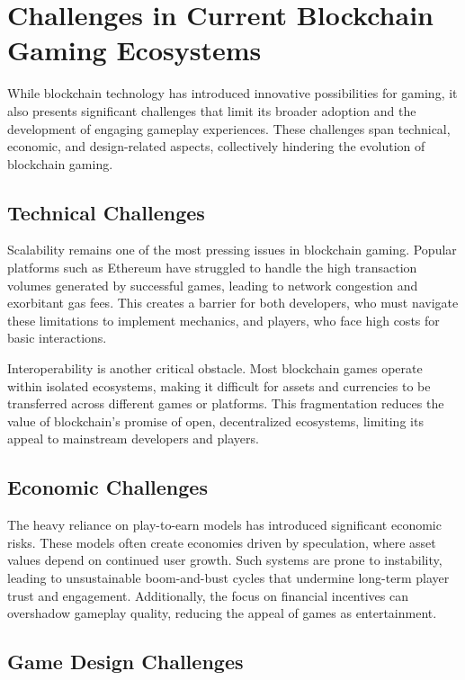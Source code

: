 \section{Challenges in Current Blockchain Gaming Ecosystems}

While blockchain technology has introduced innovative possibilities for gaming,
it also presents significant challenges that limit its broader adoption and the
development of engaging gameplay experiences. These challenges span technical,
economic, and design-related aspects, collectively hindering the evolution of
blockchain gaming.

\subsection{Technical Challenges}

Scalability remains one of the most pressing issues in blockchain gaming.
Popular platforms such as Ethereum have struggled to handle the high transaction
volumes generated by successful games, leading to network congestion and
exorbitant gas fees\cite{min_blockchain_2019}. This creates a barrier for both developers, who must
navigate these limitations to implement mechanics, and players, who face high
costs for basic interactions.

Interoperability is another critical obstacle. Most blockchain games operate
within isolated ecosystems, making it difficult for assets and currencies to be
transferred across different games or platforms. This fragmentation reduces the
value of blockchain’s promise of open, decentralized ecosystems, limiting its
appeal to mainstream developers and players\cite{jiang_cryptokitties_2021}.

\subsection{Economic Challenges}

The heavy reliance on play-to-earn models has introduced significant economic
risks. These models often create economies driven by speculation, where asset
values depend on continued user growth. Such systems are prone to instability,
leading to unsustainable boom-and-bust cycles that undermine long-term player
trust and engagement\cite{jiang_cryptokitties_2021, jiang_towards_2022}.
Additionally, the focus on financial incentives can overshadow gameplay quality,
reducing the appeal of games as entertainment.

\subsection{Game Design Challenges}

